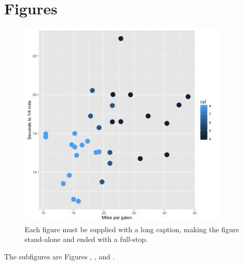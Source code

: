 %
%
\chapter{Figures}



\begin{figure}[h!tb]
\centering

\includegraphics[width=10cm]{fig/plot1} %
 
\caption[Do not end short caption with full-stop]{Each figure must be supplied with a long caption, making the figure stand-alone and ended with a full-stop.}

\end{figure}





\newpage





%

The subfigures are Figures , ,  and .

